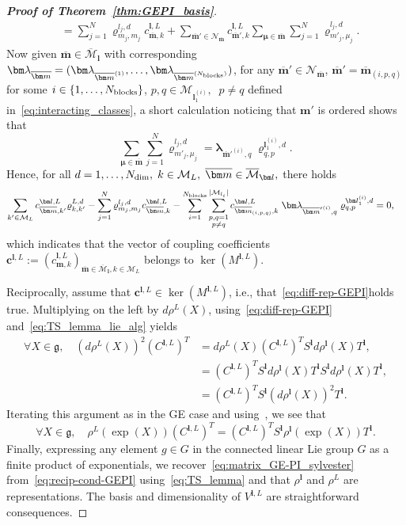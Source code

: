 \documentclass{article}
\newcommand{\vrho}[2]{\varrho^{#1}_{#2}}
\newcommand{\rep}[2]{\rho^{#1}_{#2}}
\newcommand{\blamb}[2]{\bm\lambda^{#1}_{#2}}
\newcommand{\dd}{{d}}
\newcommand{\card}[1]{|{#1}|}
\numberwithin{equation}{section}
\def\Nb{{N_{\rm blocks}}}
\def\bc{{\bm c}}
\def\bl{{\bm l}}
\def\bbm{{\bm m}}
\def\bmu{{\bm \mu}}
\def\obm{{\overline\bbm}}
\def\calN{\mathcal{N}}
\def\calM{\mathcal{M}}
\def\oMl{\overline{\calM}_\bl}
\def\Nat{{N}}
\begin{document}
\begin{proof}[\bf{Proof of Theorem~\ref{thm:GEPI_basis}}]
\begin{align*}
    &= \sum_{j=1}^\Nat \vrho{l_j,\dd}{m_j,m_j}c_{\obm,k}^{\bl,L} + \sum_{\obm' \in \calN_\obm} c_{\obm',k}^{\bl,L}
    \sum_{\bmu\in\obm}
    \sum_{j=1}^\Nat
    \vrho{l_j,\dd}{m'_j,\mu_j}.
 \end{align*}
 Now given $\obm\in \oMl$ with corresponding 
 $\blamb{}{\obm} = (\blamb{}{\obm^{(1)}},\ldots,\blamb{}{\obm^{(\Nb)}})$, for any $\obm'\in \calN_\obm$, $\obm' = \obm_{(i,p,q)}$ for some $i\in\{ 1,\ldots, \Nb\}$, $p,q \in \calM_{\bl^{(i)}_1},\;\; p\ne q
     $ defined in~\eqref{eq:interacting_classes}, a short calculation noticing that $\bbm'$ is ordered shows that
\[
\sum_{\bmu\in\obm}
    \sum_{j=1}^\Nat
    \vrho{l_j,\dd}{m'_j,\mu_j} = 
    \blamb{}{{\obm'}^{(i)},q}
    \; \vrho{\bl^{(i)}_1,\dd}{q,p}.
\]
Hence, for all $\dd =1,\ldots,N_{\rm{dim}},\; k\in\calM_L,\; \obm \in \oMl,$ there holds
\begin{align*}
    \sum_{k'\in\calM_L}c_{\obm,k'}^{\bl,L} \vrho{L,\dd}{k,k'}  
    &- \sum_{j=1}^\Nat \vrho{l_j,\dd}{m_j,m_j}c_{\obm,k}^{\bl,L} - 
    \sum_{i=1}^\Nb 
    \sum_{\substack{p,q=1 \\ p \neq q}}^{\card{\calM_{l_i}}}
     c_{\obm_{(i,p,q)},k}^{\bl,L}
    \;\blamb{}{{\obm'}^{(i)},q}
    \; \vrho{\bl^{(i)}_1,\dd}{q,p}=0, 
\end{align*}
which indicates that the vector of coupling coefficients $\bc^{\bl,L}:=\left(c_{\bbm,k}^{\bl,L}\right)_{\obm\in\oMl,k\in\mathcal{M}_L}$ belongs to $\ker(M^{\bl,L})$. 

Reciprocally, assume that $\bc^{\bl,L} \in\ker(M^{\bl,L})$, i.e., that~\eqref{eq:diff-rep-GEPI}holds true.
Multiplying on the left by $d\rep{L}{}(X)$, using~\eqref{eq:diff-rep-GEPI} and~\eqref{eq:TS_lemma_lie_alg} yields
\begin{align*}
     \forall X\in\mathfrak g, \quad \left(d\rep{L}{}(X)\right)^2\left(C^{\bl,L}\right)^T &= d\rep{L}{}(X)\left(C^{\bl,L}\right)^TS^\bl d\rep{\bl}{}(X)T^\bl, \\
     & = \left(C^{\bl,L}\right)^TS^\bl d\rep{\bl}{}(X) T^\bl S^\bl d\rep{\bl}{}(X)T^\bl, \\
     & = \left(C^{\bl,L}\right)^TS^\bl\left(d\rep{\bl}{}(X)\right)^2 T^\bl.
\end{align*}
Iterating this argument as in the GE case and using~\cite[Equation (3.11)]{Hall2013-af}, we see that
\begin{equation}\label{eq:recip-cond-GEPI}
    \forall X\in\mathfrak g,\quad \rep{L}{}\left(\exp(X)\right)\left(C^{\bl,L}\right)^T = \left(C^{\bl,L}\right)^TS^\bl\rep{\bl}{}\left(\exp(X)\right)T^\bl.
\end{equation}
Finally, expressing any element $g\in G$ in the connected linear Lie group $G$ as a finite product of exponentials, we recover~\eqref{eq:matrix_GE-PI_sylvester} from~\eqref{eq:recip-cond-GEPI} using~\eqref{eq:TS_lemma} and that $\rep{\bl}{}$ and  $\rep{L}{}$ are representations.
The basis and dimensionality of $V^{\bl,L}$ are straightforward consequences.
\end{proof}
\end{document}
